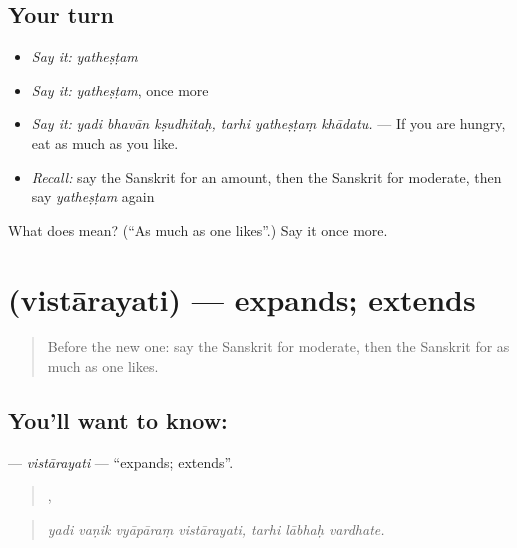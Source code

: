 \subsection*{Your turn}
\begin{itemize}
\raggedright
  \item \emph{Say it:} \emph{yatheṣṭam}
  \item \emph{Say it:} \emph{yatheṣṭam}, once more
  \item \emph{Say it:} \emph{yadi bhavān kṣudhitaḥ, tarhi yatheṣṭaṃ khādatu.} — If you are hungry, eat as much as you like.
  \item \emph{Recall:} say the Sanskrit for an amount, then the Sanskrit for moderate, then say \emph{yatheṣṭam} again
\end{itemize}

\begin{tcolorbox}[breakable,colback=teal!4,colframe=teal!35!black,title={Before you move on}]
What does  mean? (\textquotedblleft{}As much as one likes\textquotedblright{}.) Say it once more.
\end{tcolorbox}
\section[\texorpdfstring{\sk{विस्तारयति} (vistārayati)}{विस्तारयति (vistārayati)}]{ (vistārayati) — expands; extends}

\label{lesson:SA-C380-vistarayati}



\begin{quote}
Before the new one: say the Sanskrit for moderate, then the Sanskrit for as much as one likes.
\end{quote}

\subsection*{You'll want to know: }
\textbf{} — \emph{vistārayati} — \textquotedblleft{}expands; extends\textquotedblright{}.

\begin{quote}
   ,   
\end{quote}

\begin{quote}
\emph{yadi vaṇik vyāpāraṃ vistārayati, tarhi lābhaḥ vardhate.}
\end{quote}

